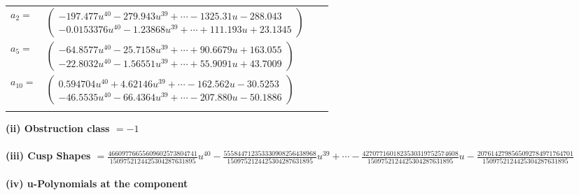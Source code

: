 \documentclass[1p]{elsarticle_modified}
\theoremstyle{definition}
\begin{document}
\begin{tabular}{m{7pt} m{180pt} m{7pt} m{180pt} }
\flushright $a_{2}=$&$\begin{pmatrix}-197.477 u^{40}-279.943 u^{39}+\cdots-1325.31 u-288.043\\-0.0153376 u^{40}-1.23868 u^{39}+\cdots+111.193 u+23.1345\end{pmatrix}$ \\
\flushright $a_{5}=$&$\begin{pmatrix}-64.8577 u^{40}-25.7158 u^{39}+\cdots+90.6679 u+163.055\\-22.8032 u^{40}-1.56551 u^{39}+\cdots+55.9091 u+43.7009\end{pmatrix}$ \\
\flushright $a_{10}=$&$\begin{pmatrix}0.594704 u^{40}+4.62146 u^{39}+\cdots-162.562 u-30.5253\\-46.5535 u^{40}-66.4364 u^{39}+\cdots-207.880 u-50.1886\end{pmatrix}$\\&\end{tabular}
\flushleft \textbf{(ii) Obstruction class $= -1$}\\~\\
\flushleft \textbf{(iii) Cusp Shapes $= \frac{46609776655609602573804741}{1509752124425304287631895} u^{40}-\frac{555844712353330908256438968}{1509752124425304287631895} u^{39}+\cdots-\frac{4270771601823530319752574608}{1509752124425304287631895} u-\frac{2076142798565092784971764701}{1509752124425304287631895}$}\\~\\
\newpage\renewcommand{\arraystretch}{1}
\flushleft \textbf{(iv) u-Polynomials at the component}\newline \\
\end{document}

